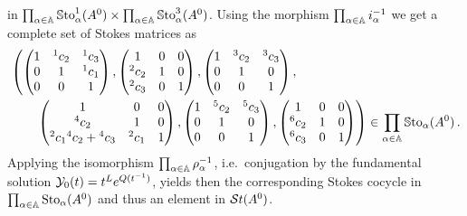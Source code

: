 in
$\prod_{\alpha\in\mathbb{A}}\operatorname{\mathbb{S}to}_{\alpha}^{1}(A^0) \times
\prod_{\alpha\in\mathbb{A}}\operatorname{\mathbb{S}to}_{\alpha}^{3}(A^0)$.
Using the morphism $\prod_{\alpha\in\mathbb{A}}i_\alpha^{-1}$ we get a complete set of
Stokes matrices as
\begin{align*}
  &\left(
    \begin{pmatrix} 1 & {}^1c_2 & {}^1c_3 \\0 & 1 & {}^1c_1 \\0 & 0 & 1 \end{pmatrix},
    \begin{pmatrix} 1 & 0 & 0 \\{}^2c_2 & 1 & 0 \\{}^2c_3 & 0 & 1 \end{pmatrix},
    \begin{pmatrix} 1 & {}^3c_2 & {}^3c_3 \\0 & 1 & 0 \\0 & 0 & 1 \end{pmatrix},
  \right.
\\&\qquad
  \left.
    \begin{pmatrix} 1 & 0 & 0 \\{}^4c_2 & 1 & 0 \\{}^2c_1{}^4c_2+{}^4c_3 & {}^2c_1 & 1 \end{pmatrix},
    \begin{pmatrix} 1 & {}^5c_2 & {}^5c_3 \\0 & 1 & 0 \\0 & 0 & 1 \end{pmatrix},
    \begin{pmatrix} 1 & 0 & 0 \\{}^{6}c_2 & 1 & 0 \\{}^{6}c_3 & 0 & 1 \end{pmatrix}
  \right)
  \in
  \prod_{\alpha\in\mathbb{A}}\operatorname{\mathbb{S}to}_{\alpha}(A^0) \,.
\end{align*}
Applying the isomorphism $\prod_{\alpha\in\mathbb{A}}\rho_\alpha^{-1}$, i.e.\
conjugation by the fundamental solution $\mathcal{Y}_0(t)=t^Le^{Q(t^{-1})}$, yields
then the corresponding Stokes cocycle in
$\prod_{\alpha\in\mathbb{A}}\operatorname{Sto}_{\alpha}(A^0)$ and thus an element in $\mathcal{S}{}t(A^0)$.
